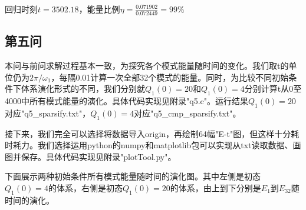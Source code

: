 \documentclass[10pt, a4paper]{article}
\begin{document}
    回归时刻$t=3502.18$，能量比例$\eta=\frac{0.071902}{0.072449}=99\%$

    \subsection{第五问}

    本问与前问求解过程基本一致，为探究各个模式能量随时间的变化。我们取t的单位仍为$2\pi/\omega_1$，每隔0.01计算一次全部32个模式的能量。同时，为比较不同初始条件下体系演化形式的不同，我们分别就$Q_1(0)=20$和$Q_1(0)=4$分别计算t从0至4000中所有模式能量的演化。具体代码实现见附录"q5.c"。运行结果$Q_1(0)=20$对应"q5_sparsify.txt"，$Q_1(0)=4$对应"q5_cmp_sparsify.txt"。

    接下来，我们完全可以选择将数据导入origin，再绘制64幅"E-t"图，但这样十分耗时耗力。我们选择运用python的numpy和matplotlib包可以实现从txt读取数据、画图并保存。具体代码实现见附录"plotTool.py"。

    下面展示两种初始条件所有模式能量随时间的演化图。其中左侧是初态$Q_1(0)=4$的体系，右侧是初态$Q_1(0)=20$的体系，由上到下分别是$E_1$到$E_{32}$随时间的演化。
\end{document}
